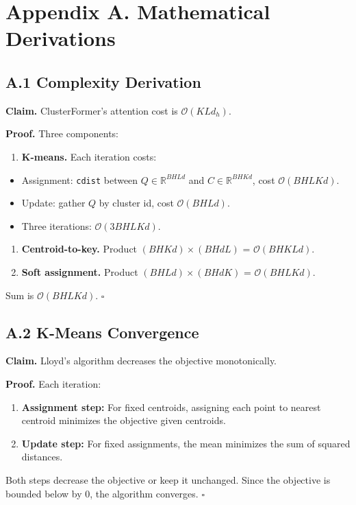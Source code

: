 \section{Appendix A. Mathematical Derivations}

\subsection{A.1 Complexity Derivation}

\textbf{Claim.} ClusterFormer's attention cost is $\mathcal{O}(K L d_h)$.

\textbf{Proof.} Three components:

\begin{enumerate}
\item \textbf{K-means.} Each iteration costs:
\end{enumerate}
\begin{itemize}
\item Assignment: \texttt{cdist} between $Q \in \mathbb{R}^{BHLd}$ and $C \in \mathbb{R}^{BH K d}$, cost $\mathcal{O}(BHLKd)$.
\item Update: gather $Q$ by cluster id, cost $\mathcal{O}(BHLd)$.
\item Three iterations: $\mathcal{O}(3 BHLKd)$.

\end{itemize}
\begin{enumerate}
\item \textbf{Centroid-to-key.} Product $(BH K d) \times (BH d L)$ = $\mathcal{O}(BHKLd)$.

\item \textbf{Soft assignment.} Product $(BH L d) \times (BH d K)$ = $\mathcal{O}(BH LKd)$.

\end{enumerate}
Sum is $\mathcal{O}(BHLKd)$. $\square$

\subsection{A.2 K-Means Convergence}

\textbf{Claim.} Lloyd's algorithm decreases the objective monotonically.

\textbf{Proof.} Each iteration:

\begin{enumerate}
\item \textbf{Assignment step:} For fixed centroids, assigning each point to
  nearest centroid minimizes the objective given centroids.
\item \textbf{Update step:} For fixed assignments, the mean minimizes the sum of
  squared distances.

\end{enumerate}
Both steps decrease the objective or keep it unchanged. Since the objective 
is bounded below by 0, the algorithm converges. $\square$

